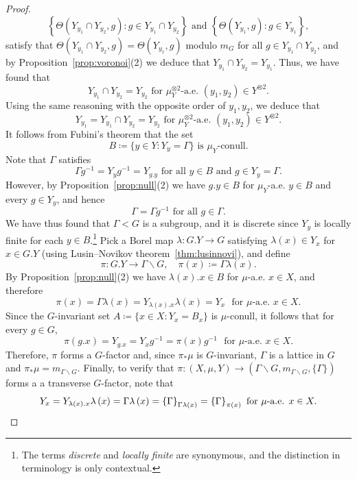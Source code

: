 \documentclass{amsart}
\numberwithin{equation}{subsection}
\theoremstyle{remark}
\begin{document}
\begin{proof}
\[\left\{\Theta\left(Y_{y_{1}}\cap Y_{y_{2}},g\right): g\in Y_{y_{1}}\cap Y_{y_{2}}\right\} \text{ and }\left\{\Theta\left(Y_{y_{1}},g\right): g\in Y_{y_{1}}\right\},\]
satisfy that \(\Theta\left(Y_{y_{1}}\cap Y_{y_{2}},g\right)=\Theta\left(Y_{y_{1}},g\right)\) modulo \(m_{G}\) for all \(g\in Y_{y_{1}}\cap Y_{y_{2}}\), and by Proposition~\ref{prop:voronoi}(2) we deduce that \(Y_{y_{1}}\cap Y_{y_{2}}=Y_{y_{1}}\). Thus, we have found that
\[Y_{y_{1}}\cap Y_{y_{2}}=Y_{y_{2}}\text{ for }\mu_{Y}^{\otimes2}\text{-a.e. }\left(y_{1},y_{2}\right)\in Y^{\otimes2}.\]
Using the same reasoning with the opposite order of \(y_{1},y_{2}\), we deduce that
\[Y_{y_{1}}=Y_{y_{1}}\cap Y_{y_{2}}=Y_{y_{2}}\text{ for }\mu_{Y}^{\otimes 2}\text{-a.e. }\left(y_{1},y_{2}\right)\in Y^{\otimes 2}.\]
It follows from Fubini's theorem that the set
\[B\coloneqq\{y\in Y:Y_{y}=\Gamma\}\text{ is }\mu_{Y}\text{-conull}.\]
Note that \(\Gamma\) satisfies
\[\Gamma g^{-1}=Y_{y}g^{-1}=Y_{g.y}\text{ for all }y\in B\text{ and }g\in Y_{y}=\Gamma.\]
However, by Proposition~\ref{prop:null}(2) we have \(g.y\in B\) for \(\mu_{Y}\)-a.e. \(y\in B\) and every \(g\in Y_{y}\), and hence
\[\Gamma=\Gamma g^{-1}\text{ for all }g\in\Gamma.\]
We have thus found that \(\Gamma<G\) is a subgroup, and it is discrete since \(Y_{y}\) is locally finite for each \(y\in B\).\footnote{The terms \emph{discrete} and \emph{locally finite} are synonymous, and the distinction in terminology is only contextual.} Pick a Borel map \(\lambda:G.Y\to G\) satisfying \(\lambda\left(x\right)\in Y_{x}\) for \(x\in G.Y\) (using Lusin--Novikov theorem~\ref{thm:lusinnovi}), and define
\[\pi:G.Y\to\Gamma\backslash G,\quad\pi\left(x\right)\coloneqq \Gamma\lambda\left(x\right).\]
By Proposition~\ref{prop:null}(2) we have \(\lambda\left(x\right).x\in B\) for \(\mu\)-a.e. \(x\in X\), and therefore
\[\pi\left(x\right)=\Gamma\lambda\left(x\right)=Y_{\lambda\left(x\right).x}\lambda\left(x\right)=Y_{x}\,\,\text{ for }\mu\text{-a.e. }x\in X.\]
Since the \(G\)-invariant set \(A\coloneqq\{x\in X:Y_{x}=B_{x}\}\) is \(\mu\)-conull, it follows that for every \(g\in G\),
\[\pi\left(g.x\right)=Y_{g.x}=Y_{x}g^{-1}=\pi\left(x\right)g^{-1}\,\,\text{ for }\mu\text{-a.e. }x\in X.\]
Therefore, \(\pi\) forms a \(G\)-factor and, since \(\pi_{\ast}\mu\) is \(G\)-invariant, \(\Gamma\) is a lattice in \(G\) and \(\pi_{\ast}\mu=m_{\Gamma\backslash G}\). Finally, to verify that \(\pi:\left(X,\mu,Y\right)\to\left(\Gamma\backslash G,m_{\Gamma\backslash G},\{\Gamma\}\right)\) forms a a transverse \(G\)-factor, note that
\[Y_{x}=Y_{\lambda\left(x\right).x}\lambda\left(x\right)=\Gamma\lambda\left(x\right)=\left\{ \Gamma\right\} _{\Gamma\lambda\left(x\right)}=\left\{ \Gamma\right\} _{\pi\left(x\right)}\text{ for }\mu\text{-a.e. }x\in X.\qedhere\]
\end{proof}
\end{document}
